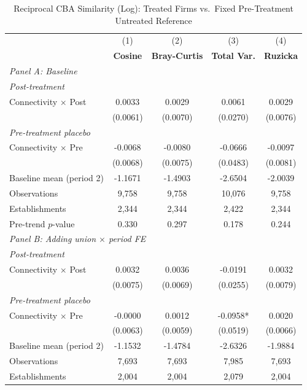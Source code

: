 \begin{table}[H]
\centering
\caption{Reciprocal CBA Similarity (Log): Treated Firms vs.\ Fixed Pre-Treatment Untreated Reference}
\label{tab:treated_pretreat_ref_uncorr_w_ln_cba_similarity}
\scriptsize
\setlength{\tabcolsep}{8pt}
\begin{tabular}{lcccc}
\toprule\toprule
 & (1) & (2) & (3) & (4) \\
 & \textbf{Cosine} & \textbf{Bray-Curtis} & \textbf{Total Var.} & \textbf{Ruzicka} \\
\midrule
\multicolumn{5}{l}{\textit{Panel A: Baseline}} \\
\multicolumn{5}{l}{\textit{Post-treatment}} \\
Connectivity $\times$ Post & 0.0033 & 0.0029 & 0.0061 & 0.0029 \\
 & (0.0061) & (0.0070) & (0.0270) & (0.0076) \\
\multicolumn{5}{l}{\textit{Pre-treatment placebo}} \\
Connectivity $\times$ Pre & -0.0068 & -0.0080 & -0.0666 & -0.0097 \\
 & (0.0068) & (0.0075) & (0.0483) & (0.0081) \\
\midrule
Baseline mean (period 2) & -1.1671 & -1.4903 & -2.6504 & -2.0039 \\
Observations &        9,758 &        9,758 &       10,076 &        9,758 \\
Establishments &        2,344 &        2,344 &        2,422 &        2,344 \\
Pre-trend $p$-value & 0.330 & 0.297 & 0.178 & 0.244 \\
\midrule
\multicolumn{5}{l}{\textit{Panel B: Adding union $\times$ period FE}} \\
\multicolumn{5}{l}{\textit{Post-treatment}} \\
Connectivity $\times$ Post & 0.0032 & 0.0036 & -0.0191 & 0.0032 \\
 & (0.0075) & (0.0069) & (0.0255) & (0.0079) \\
\multicolumn{5}{l}{\textit{Pre-treatment placebo}} \\
Connectivity $\times$ Pre & -0.0000 & 0.0012 & -0.0958* & 0.0020 \\
 & (0.0063) & (0.0059) & (0.0519) & (0.0066) \\
\midrule
Baseline mean (period 2) & -1.1532 & -1.4784 & -2.6326 & -1.9884 \\
Observations &        7,693 &        7,693 &        7,985 &        7,693 \\
Establishments &        2,004 &        2,004 &        2,079 &        2,004 \\

\end{tabular}
\end{table}
